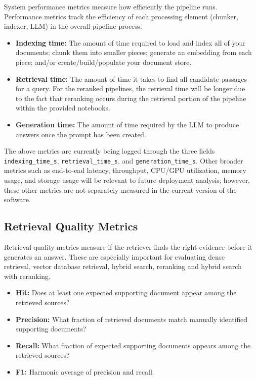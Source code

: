 System performance metrics measure how efficiently the pipeline runs. Performance metrics track the efficiency of each processing element (chunker, indexer, LLM) in the overall pipeline process:
\begin{itemize}
    \item \textbf{Indexing time:} The amount of time required to load and index all of your documents; chunk them into smaller pieces; generate an embedding from each piece; and/or create/build/populate your document store.
    \item \textbf{Retrieval time:} The amount of time it takes to find all candidate passages for a query. For the reranked pipelines, the retrieval time will be longer due to the fact that reranking occurs during the retrieval portion of the pipeline within the provided notebooks.
    \item \textbf{Generation time:} The amount of time required by the LLM to produce answers once the prompt has been created.
\end{itemize}

The above metrics are currently being logged through the three fields \texttt{indexing\_time\_s}, \texttt{retrieval\_time\_s}, and \texttt{generation\_time\_s}. Other broader metrics such as end-to-end latency, throughput, CPU/GPU utilization, memory usage, and storage usage will be relevant to future deployment analysis; however, these other metrics are not separately measured in the current version of the software.

\subsection{Retrieval Quality Metrics}

Retrieval quality metrics measure if the retriever finds the right evidence before it generates an answer. These are especially important for evaluating dense retrieval, vector database retrieval, hybrid search, reranking and hybrid search with reranking.

\begin{itemize}
    \item \textbf{Hit:} Does at least one expected supporting document appear among the retrieved sources?
    \item \textbf{Precision:} What fraction of retrieved documents match manually identified supporting documents?
    \item \textbf{Recall:} What fraction of expected supporting documents appears among the retrieved sources?
    \item \textbf{F1:} Harmonic average of precision and recall.
\end{itemize}


